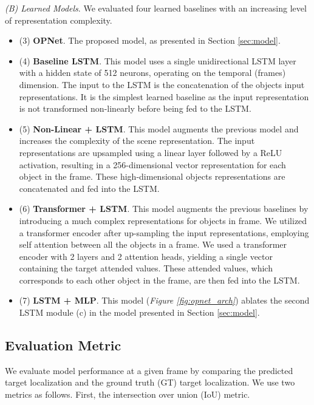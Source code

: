 \documentclass[]{llncs}
\newcommand{\secref}[1]{Section \ref{#1}}
\begin{document}
\noindent\textit{(B) Learned Models}. We evaluated four learned baselines with an increasing level of representation complexity.
\begin{itemize}
    \item (3) \textbf{OPNet}. The proposed model, as  presented in \secref{sec:model}.

    \item (4) \textbf{Baseline LSTM}. This model uses a single unidirectional LSTM layer with a hidden state of 512 neurons, operating on the temporal (frames) dimension. The input to the LSTM is the concatenation of the objects input representations. It is the simplest learned baseline as the input representation is not transformed non-linearly before being fed to the LSTM. 
    
    \item (5) \textbf{Non-Linear + LSTM}. This model augments the previous model and increases the complexity of the scene representation. The input representations are upsampled using a linear layer followed by a ReLU activation, resulting in a 256-dimensional vector representation for each object in the frame. These high-dimensional objects representations are concatenated and fed into the LSTM.
    
    \item (6) \textbf{Transformer + LSTM}. This model augments the previous baselines by introducing a much complex representations for objects in frame. We utilized a transformer encoder \cite{vaswani2017attention} after up-sampling the input representations, employing self attention between all the objects in a frame. We used a transformer encoder with 2 layers and 2 attention heads, yielding a single vector containing the target attended values. These attended values, which corresponds to each other object in the frame, are then fed into the LSTM.
    
    \item (7) \textbf{LSTM + MLP}. This model (\textit{Figure \ref{fig:opnet_arch}}) ablates the second LSTM module (c) in the model presented in \secref{sec:model}.
    \end{itemize}

\subsection{Evaluation Metric}
We evaluate model performance at a given frame  by comparing the predicted target localization and the ground truth (GT) target localization. We use two metrics as follows. First, the intersection over union (IoU) metric.
\end{document}
